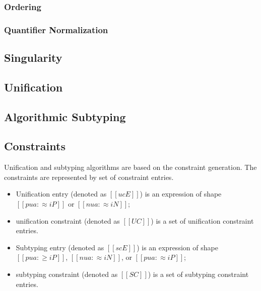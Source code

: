 \documentclass[a4,natbib=false]{article}
\begin{document}
\subsubsection{Ordering}
\ottdefnsOrder

\subsubsection{Quantifier Normalization}
\ottdefnsNrm

\subsection{Singularity}
\ottdefnsSING


\subsection{Unification}
\ottdefnsU

\subsection{Algorithmic Subtyping}
\ottdefnsA


\subsection{Constraints}

Unification and subtyping algorithms are based on the constraint generation.
The constraints are represented by set of constraint entries.

\begin{definition}
  \hfill
  \begin{itemize}
    \item Unification entry (denoted as $[[ucE]]$) is an expression of shape 
      $[[pua :≈ iP]]$ or $[[nua :≈ iN]]$;
    \item unification constraint (denoted as $[[UC]]$) is a set of 
      unification constraint entries.
  \end{itemize}

\end{definition}

\begin{definition}
  \hfill
  \begin{itemize}
    \item Subtyping entry (denoted as $[[scE]]$) is an expression of shape 
      $[[pua :≥ iP]]$, $[[nua :≈ iN]]$, or $[[pua :≈ iP]]$;
    \item subtyping constraint (denoted as $[[SC]]$) is a set of subtyping constraint entries.
  \end{itemize}
\end{definition}
\end{document}
